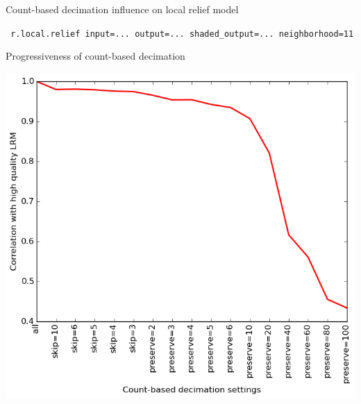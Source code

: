 \documentclass[xcolor={dvipsnames,usenames},beamer,aspectratio=1610]{beamer}
\begin{document}
\begin{frame}{Count-based decimation influence on local relief model}
%
~%
%
~%
%
~%
%

\bigskip

\begin{flushleft}

\texttt{
r.local.relief
input=...
output=...
shaded\_output=...
neighborhood=11
}


\end{flushleft}

\end{frame}


\begin{frame}{Progressiveness of count-based decimation}

\begin{center}
\includegraphics[height=0.8\textheight]{lrm_count}
\end{center}

\end{frame}
\end{document}
